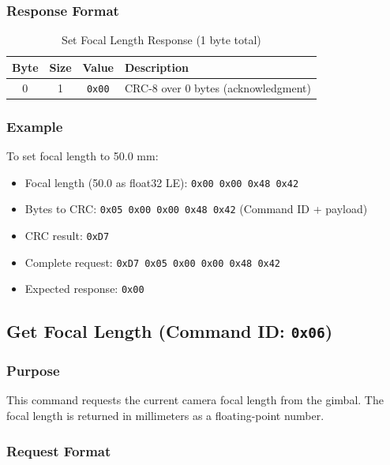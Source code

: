 \documentclass[12pt, titlepage]{article}
\begin{document}
\subsubsection{Response Format}

\begin{table}[H]
  \centering
  \begin{tabular}{cccl}
    \toprule
    \textbf{Byte} & \textbf{Size} & \textbf{Value} & \textbf{Description}                \\
    \midrule
    0             & 1             & \texttt{0x00}  & CRC-8 over 0 bytes (acknowledgment) \\
    \bottomrule
  \end{tabular}
  \caption{Set Focal Length Response (1 byte total)}
\end{table}

\subsubsection{Example}

To set focal length to 50.0 mm:
\begin{itemize}
  \item Focal length (50.0 as float32 LE): \texttt{0x00 0x00 0x48 0x42}
  \item Bytes to CRC: \texttt{0x05 0x00 0x00 0x48 0x42} (Command ID + payload)
  \item CRC result: \texttt{0xD7}
  \item Complete request: \texttt{0xD7 0x05 0x00 0x00 0x48 0x42}
  \item Expected response: \texttt{0x00}
\end{itemize}

\subsection{Get Focal Length (Command ID: \texttt{0x06})}

\subsubsection{Purpose}
This command requests the current camera focal length from the gimbal. The
focal length is returned in millimeters as a floating-point number.

\subsubsection{Request Format}
\end{document}
